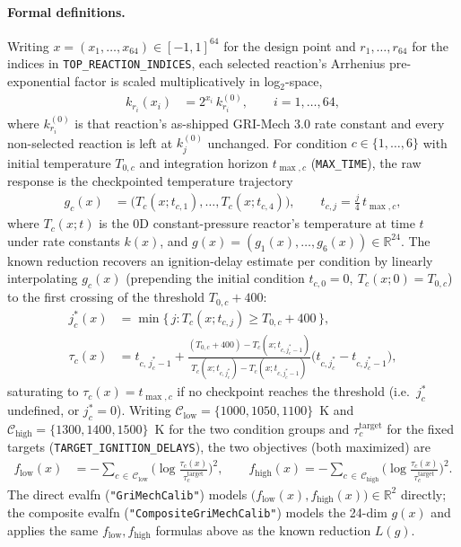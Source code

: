 \documentclass[11pt]{article}
\begin{document}
\paragraph{Formal definitions.} Writing $x = (x_1, \ldots, x_{64}) \in
[-1,1]^{64}$ for the design point and $r_1, \ldots, r_{64}$ for the
indices in \texttt{TOP\_REACTION\_INDICES}, each selected reaction's
Arrhenius pre-exponential factor is scaled multiplicatively in
log$_2$-space,
\begin{align}
k_{r_i}(x_i) &= 2^{x_i}\, k_{r_i}^{(0)}, \qquad i = 1, \ldots, 64,
\end{align}
where $k_{r_i}^{(0)}$ is that reaction's as-shipped GRI-Mech 3.0 rate
constant and every non-selected reaction is left at $k_j^{(0)}$
unchanged. For condition $c \in \{1,\ldots,6\}$ with initial temperature
$T_{0,c}$ and integration horizon $t_{\max,c}$
(\texttt{MAX\_TIME}), the raw response is the checkpointed temperature
trajectory
\begin{align}
g_c(x) &= \big(T_c(x; t_{c,1}), \ldots, T_c(x; t_{c,4})\big), \qquad
t_{c,j} = \frac{j}{4}\, t_{\max,c},
\end{align}
where $T_c(x; t)$ is the 0D constant-pressure reactor's temperature at
time $t$ under rate constants $k(x)$, and $g(x) = (g_1(x), \ldots,
g_6(x)) \in \mathbb{R}^{24}$. The known reduction recovers an
ignition-delay estimate per condition by linearly interpolating $g_c(x)$
(prepending the initial condition $t_{c,0}=0,\ T_c(x;0) = T_{0,c}$) to
the first crossing of the threshold $T_{0,c} + 400$:
\begin{align}
j^*_c(x) &= \min\{\, j : T_c(x; t_{c,j}) \ge T_{0,c} + 400 \,\}, \\
\tau_c(x) &= t_{c,\,j^*_c-1} + \frac{(T_{0,c}+400) - T_c(x; t_{c,j^*_c-1})}
{T_c(x; t_{c,j^*_c}) - T_c(x; t_{c,j^*_c-1})}
\Big(t_{c,j^*_c} - t_{c,j^*_c-1}\Big),
\end{align}
saturating to $\tau_c(x) = t_{\max,c}$ if no checkpoint reaches the
threshold (i.e.\ $j^*_c$ undefined, or $j^*_c = 0$). Writing
$\mathcal{C}_{\mathrm{low}} = \{1000, 1050, 1100\}$~K and
$\mathcal{C}_{\mathrm{high}} = \{1300, 1400, 1500\}$~K for the two
condition groups and $\tau_c^{\mathrm{target}}$ for the fixed targets
(\texttt{TARGET\_IGNITION\_DELAYS}), the two objectives (both
maximized) are
\begin{align}
f_{\mathrm{low}}(x) &= -\!\!\sum_{c \,\in\, \mathcal{C}_{\mathrm{low}}}
\Big(\log \tfrac{\tau_c(x)}{\tau_c^{\mathrm{target}}}\Big)^{\!2},
\qquad
f_{\mathrm{high}}(x) = -\!\!\sum_{c \,\in\, \mathcal{C}_{\mathrm{high}}}
\Big(\log \tfrac{\tau_c(x)}{\tau_c^{\mathrm{target}}}\Big)^{\!2}.
\end{align}
The direct evalfn (\texttt{"GriMechCalib"}) models
$\big(f_{\mathrm{low}}(x), f_{\mathrm{high}}(x)\big) \in \mathbb{R}^2$
directly; the composite evalfn (\texttt{"CompositeGriMechCalib"}) models
the 24-dim $g(x)$ and applies the same $f_{\mathrm{low}}, f_{\mathrm{high}}$
formulas above as the known reduction $L(g)$.
\end{document}
